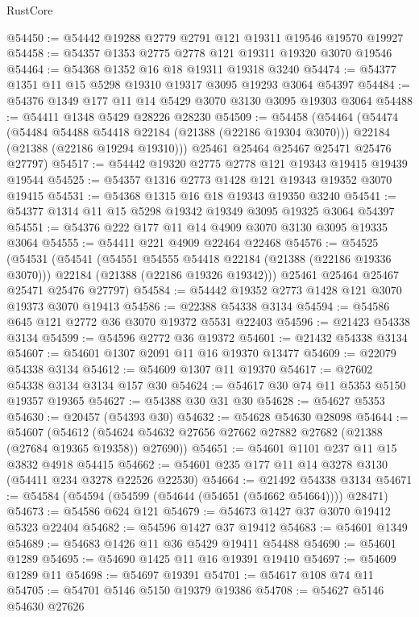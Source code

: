 \begin{lexlean}{RustCore}
\begin{coremodule}
@54450 := @54442 @19288 @2779 @2791 @121 @19311 @19546 @19570 @19927
@54458 := @54357 @1353 @2775 @2778 @121 @19311 @19320 @3070 @19546
@54464 := @54368 @1352 @16 @18 @19311 @19318 @3240
@54474 := @54377 @1351 @11 @15 @5298 @19310 @19317 @3095 @19293 @3064 @54397
@54484 := @54376 @1349 @177 @11 @14 @5429 @3070 @3130 @3095 @19303 @3064
@54488 := @54411 @1348 @5429 @28226 @28230
@54509 := @54458
    (@54464
      (@54474
        (@54484 @54488 @54418 @22184 (@21388 (@22186 @19304 @3070)))
        @22184
        (@21388 (@22186 @19294 @19310)))
      @25461
      @25464
      @25467
      @25471
      @25476
      @27797)
@54517 := @54442 @19320 @2775 @2778 @121 @19343 @19415 @19439 @19544
@54525 := @54357 @1316 @2773 @1428 @121 @19343 @19352 @3070 @19415
@54531 := @54368 @1315 @16 @18 @19343 @19350 @3240
@54541 := @54377 @1314 @11 @15 @5298 @19342 @19349 @3095 @19325 @3064 @54397
@54551 := @54376 @222 @177 @11 @14 @4909 @3070 @3130 @3095 @19335 @3064
@54555 := @54411 @221 @4909 @22464 @22468
@54576 := @54525
    (@54531
      (@54541
        (@54551 @54555 @54418 @22184 (@21388 (@22186 @19336 @3070)))
        @22184
        (@21388 (@22186 @19326 @19342)))
      @25461
      @25464
      @25467
      @25471
      @25476
      @27797)
@54584 := @54442 @19352 @2773 @1428 @121 @3070 @19373 @3070 @19413
@54586 := @22388 @54338 @3134
@54594 := @54586 @645 @121 @2772 @36 @3070 @19372 @5531 @22403
@54596 := @21423 @54338 @3134
@54599 := @54596 @2772 @36 @19372
@54601 := @21432 @54338 @3134
@54607 := @54601 @1307 @2091 @11 @16 @19370 @13477
@54609 := @22079 @54338 @3134
@54612 := @54609 @1307 @11 @19370
@54617 := @27602 @54338 @3134 @3134 @157 @30
@54624 := @54617 @30 @74 @11 @5353 @5150 @19357 @19365
@54627 := @54388 @30 @31 @30
@54628 := @54627 @5353
@54630 := @20457 (@54393 @30)
@54632 := @54628 @54630 @28098
@54644 := @54607
    (@54612 (@54624 @54632 @27656 @27662 @27882 @27682 (@21388 (@27684 @19365 @19358)) @27690))
@54651 := @54601 @1101 @237 @11 @15 @3832 @4918 @54415
@54662 := @54601 @235 @177 @11 @14 @3278 @3130 (@54411 @234 @3278 @22526 @22530)
@54664 := @21492 @54338 @3134
@54671 := @54584 (@54594 (@54599 (@54644 (@54651 (@54662 @54664)))) @28471)
@54673 := @54586 @624 @121
@54679 := @54673 @1427 @37 @3070 @19412 @5323 @22404
@54682 := @54596 @1427 @37 @19412
@54683 := @54601 @1349
@54689 := @54683 @1426 @11 @36 @5429 @19411 @54488
@54690 := @54601 @1289
@54695 := @54690 @1425 @11 @16 @19391 @19410
@54697 := @54609 @1289 @11
@54698 := @54697 @19391
@54701 := @54617 @108 @74 @11
@54705 := @54701 @5146 @5150 @19379 @19386
@54708 := @54627 @5146 @54630 @27626

\end{coremodule}
\end{lexlean}
